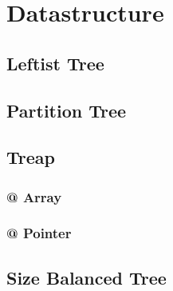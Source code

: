\section{Datastructure}
	\subsection{Leftist Tree}
		
	\subsection{Partition Tree}
		
	\subsection{Treap}
		\subsubsection{@ Array}
			
		\subsubsection{@ Pointer}
			
	\subsection{Size Balanced Tree}
		
